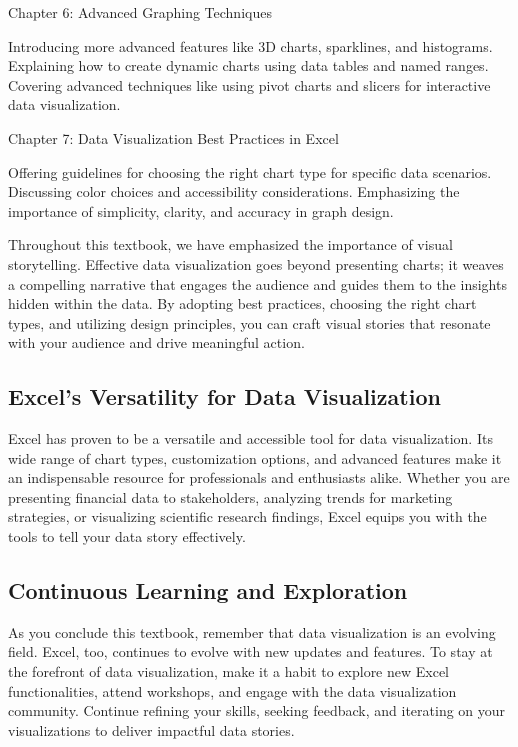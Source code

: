 \documentclass[
]{book}
\begin{document}
Chapter 6: Advanced Graphing Techniques

Introducing more advanced features like 3D charts, sparklines, and histograms.
Explaining how to create dynamic charts using data tables and named ranges.
Covering advanced techniques like using pivot charts and slicers for interactive data visualization.

Chapter 7: Data Visualization Best Practices in Excel

Offering guidelines for choosing the right chart type for specific data scenarios.
Discussing color choices and accessibility considerations.
Emphasizing the importance of simplicity, clarity, and accuracy in graph design.

Throughout this textbook, we have emphasized the importance of visual storytelling. Effective data visualization goes beyond presenting charts; it weaves a compelling narrative that engages the audience and guides them to the insights hidden within the data. By adopting best practices, choosing the right chart types, and utilizing design principles, you can craft visual stories that resonate with your audience and drive meaningful action.

\hypertarget{excels-versatility-for-data-visualization}{%
\subsection{Excel's Versatility for Data Visualization}\label{excels-versatility-for-data-visualization}}

Excel has proven to be a versatile and accessible tool for data visualization. Its wide range of chart types, customization options, and advanced features make it an indispensable resource for professionals and enthusiasts alike. Whether you are presenting financial data to stakeholders, analyzing trends for marketing strategies, or visualizing scientific research findings, Excel equips you with the tools to tell your data story effectively.

\hypertarget{continuous-learning-and-exploration}{%
\subsection{Continuous Learning and Exploration}\label{continuous-learning-and-exploration}}

As you conclude this textbook, remember that data visualization is an evolving field. Excel, too, continues to evolve with new updates and features. To stay at the forefront of data visualization, make it a habit to explore new Excel functionalities, attend workshops, and engage with the data visualization community. Continue refining your skills, seeking feedback, and iterating on your visualizations to deliver impactful data stories.
\end{document}
